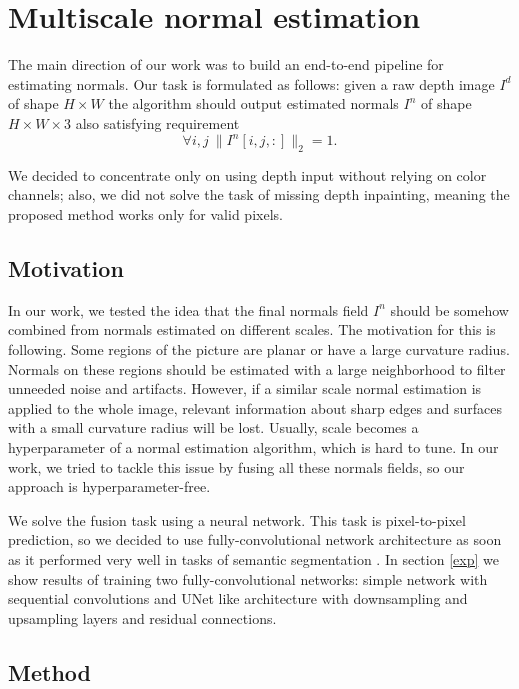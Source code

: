 \chapter{Multiscale normal estimation} \label{multiscale-normal-estimation}

The main direction of our work was to build an end-to-end pipeline for estimating normals. Our task is formulated as follows: given a raw depth image $I^d$ of shape $H \times W$ the algorithm should output estimated normals $I^n$ of shape $H \times W \times 3$ also satisfying requirement 
\begin{equation}
\forall i,j\ \|I^n\left[i, j, :\right]\|_2 = 1. \label{eq:1}
\end{equation}

We decided to concentrate only on using depth input without relying on color channels; also, we did not solve the task of missing depth inpainting, meaning the proposed method works only for valid pixels.

\section{Motivation}

In our work, we tested the idea that the final normals field $I^n$ should be somehow combined from normals estimated on different scales. The motivation for this is following. Some regions of the picture are planar or have a large curvature radius. Normals on these regions should be estimated with a large neighborhood to filter unneeded noise and artifacts. However, if a similar scale normal estimation is applied to the whole image, relevant information about sharp edges and surfaces with a small curvature radius will be lost. Usually, scale becomes a hyperparameter of a normal estimation algorithm, which is hard to tune. In our work, we tried to tackle this issue by fusing all these normals fields, so our approach is hyperparameter-free.

We solve the fusion task using a neural network. This task is pixel-to-pixel prediction, so we decided to use fully-convolutional network architecture as soon as it performed very well in tasks of semantic segmentation \cite{fcn}. In section \ref{exp} we show results of training two fully-convolutional networks: simple network with sequential convolutions and UNet \cite{unet} like architecture with downsampling and upsampling layers and residual connections.

\section{Method} \label{method}

